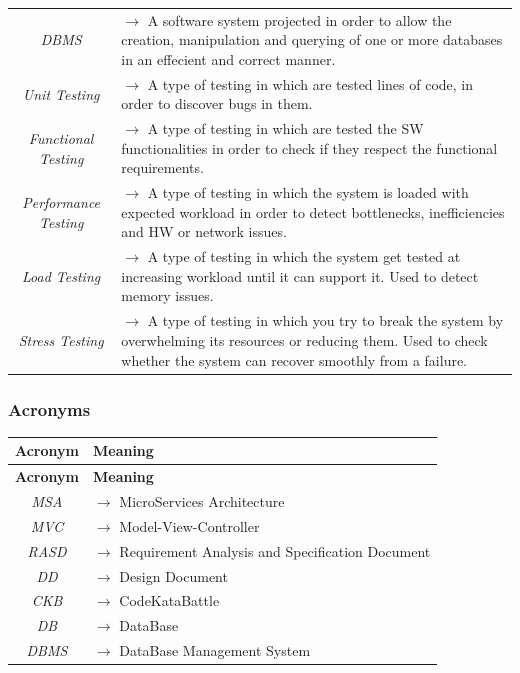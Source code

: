 \documentclass{article}
\begin{document}
{\begin{xltabular}{\textwidth}{ >{\raggedright\arraybackslash}c >{\raggedright\arraybackslash}X }
    \textit{DBMS} & $\rightarrow$ A software system projected in order to allow the creation,
    manipulation and querying of one or more databases in an effecient and correct manner. \\
    \textit{Unit Testing} & $\rightarrow$ A type of testing in which are tested lines of code,
    in order to discover bugs in them. \\
    \textit{Functional Testing} & $\rightarrow$ A type of testing in which are tested the
    SW functionalities in order to check if they respect the functional requirements. \\
    \textit{Performance Testing} & $\rightarrow$ A type of testing in which the system is loaded
    with expected workload in order to detect bottlenecks, inefficiencies and HW or network issues. \\
    \textit{Load Testing} & $\rightarrow$ A type of testing in which the system get tested at
    increasing workload until it can support it. Used to detect memory issues. \\
    \textit{Stress Testing} & $\rightarrow$ A type of testing in which you try to break the
    system by overwhelming its resources or reducing them. Used to check whether the system
    can recover smoothly from a failure.
\end{xltabular}

\subsubsection{Acronyms}
\begin{xltabular}{\textwidth}{ >{\raggedright\arraybackslash}c >{\raggedright\arraybackslash}X }
    \hline
    \textbf{Acronym} & \textbf{Meaning} \\
    \hline

    \endfirsthead

    \hline
    \textbf{Acronym} & \textbf{Meaning} \\
    \hline

    \endhead
    \endfoot
    \endlastfoot

    \textit{MSA} & $\rightarrow$ MicroServices Architecture\\
    \textit{MVC} & $\rightarrow$ Model-View-Controller\\
    \textit{RASD} & $\rightarrow$ Requirement Analysis and Specification Document\\
    \textit{DD} & $\rightarrow$ Design Document\\
    \textit{CKB} & $\rightarrow$ CodeKataBattle\\
    \textit{DB} & $\rightarrow$ DataBase \\
    \textit{DBMS} & $\rightarrow$ DataBase Management System


\end{xltabular}}
\end{document}
